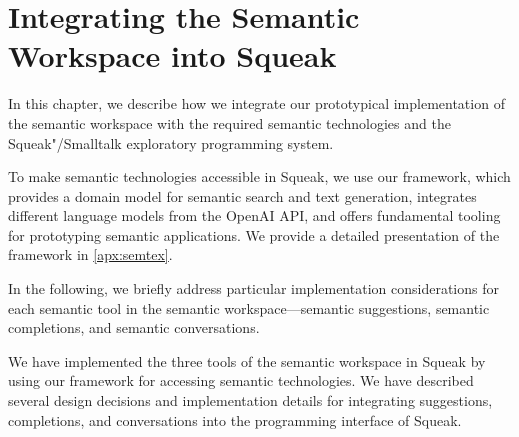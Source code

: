 
\chapter{Integrating the Semantic Workspace into Squeak}
\label{cha:implementation}

In this chapter, we describe how we integrate our prototypical implementation of the semantic workspace with the required semantic technologies and the Squeak"/Smalltalk exploratory programming system.

To make semantic technologies accessible in Squeak, we use our \semtex framework, which provides a domain model for semantic search and text generation, integrates different language models from the OpenAI API, and offers fundamental tooling for prototyping semantic applications.
We provide a detailed presentation of the framework in \cref{apx:semtex}.

In the following, we briefly address particular implementation considerations for each semantic tool in the semantic workspace---semantic suggestions, semantic completions, and semantic conversations.



\begin{summary}
	We have implemented the three tools of the semantic workspace in Squeak by using our \semtex framework for accessing semantic technologies.
	We have described several design decisions and implementation details for integrating suggestions, completions, and conversations into the programming interface of Squeak.
\end{summary}

